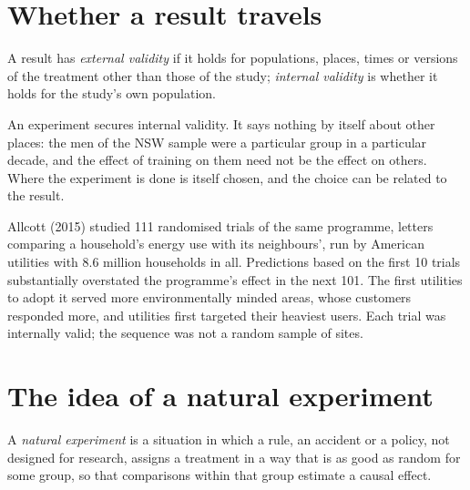 \section{Whether a result travels}\label{sec:b2:causality-and-experiments:external}

\begin{definition}\label{def:b2:causality-and-experiments:external-validity}
A result has \emph{external validity} if it holds for populations, places, times or versions of
the treatment other than those of the study; \emph{internal validity} is whether it holds for the study's own population.
\end{definition}

An experiment secures internal validity. It says nothing by itself about other places: the men of the NSW sample were a
particular group in a particular decade, and the effect of training on them need not be the effect on others. Where the
experiment is done is itself chosen, and the choice can be related to the result.

\begin{record}
Allcott (2015) studied 111 randomised trials of the same programme, letters comparing a household's energy use with its
neighbours', run by American utilities with 8.6 million households in all. Predictions based on the first 10 trials
substantially overstated the programme's effect in the next 101. The first utilities to adopt it served more
environmentally minded areas, whose customers responded more, and utilities first targeted their heaviest users. Each
trial was internally valid; the sequence was not a random sample of sites.
\end{record}

\section{The idea of a natural experiment}\label{sec:b2:causality-and-experiments:natural}

\begin{definition}\label{def:b2:causality-and-experiments:natural-experiment}
A \emph{natural experiment} is a situation in which a rule, an accident or a policy, not designed
for research, assigns a treatment in a way that is as good as random for some group, so that comparisons within that group
estimate a causal effect.
\end{definition}

